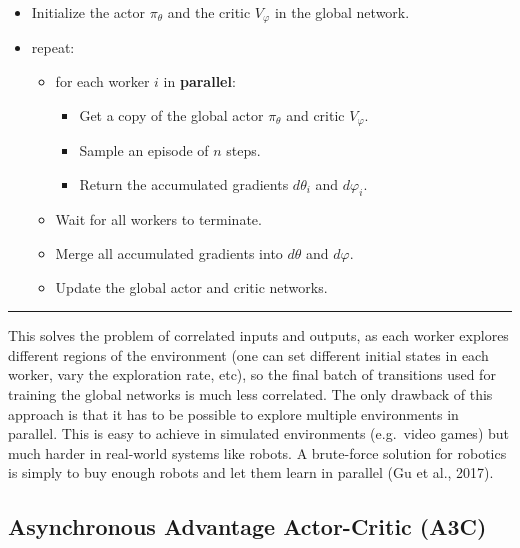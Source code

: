 \documentclass[
  letterpaper,
  DIV=11,
  numbers=noendperiod]{scrreprt}
\providecommand{\tightlist}{%
  \setlength{\itemsep}{0pt}\setlength{\parskip}{0pt}}\usepackage{longtable,booktabs,array}
\begin{document}
\begin{itemize}
\tightlist
\item
  Initialize the actor \(\pi_\theta\) and the critic \(V_\varphi\) in
  the global network.
\item
  repeat:

  \begin{itemize}
  \tightlist
  \item
    for each worker \(i\) in \textbf{parallel}:

    \begin{itemize}
    \tightlist
    \item
      Get a copy of the global actor \(\pi_\theta\) and critic
      \(V_\varphi\).
    \item
      Sample an episode of \(n\) steps.
    \item
      Return the accumulated gradients \(d\theta_i\) and \(d\varphi_i\).
    \end{itemize}
  \item
    Wait for all workers to terminate.
  \item
    Merge all accumulated gradients into \(d\theta\) and \(d\varphi\).
  \item
    Update the global actor and critic networks.
  \end{itemize}
\end{itemize}

\begin{center}\rule{0.5\linewidth}{0.5pt}\end{center}

This solves the problem of correlated inputs and outputs, as each worker
explores different regions of the environment (one can set different
initial states in each worker, vary the exploration rate, etc), so the
final batch of transitions used for training the global networks is much
less correlated. The only drawback of this approach is that it has to be
possible to explore multiple environments in parallel. This is easy to
achieve in simulated environments (e.g.~video games) but much harder in
real-world systems like robots. A brute-force solution for robotics is
simply to buy enough robots and let them learn in parallel (Gu et al.,
2017).

\hypertarget{asynchronous-advantage-actor-critic-a3c}{%
\subsection{Asynchronous Advantage Actor-Critic
(A3C)}\label{asynchronous-advantage-actor-critic-a3c}}
\end{document}
